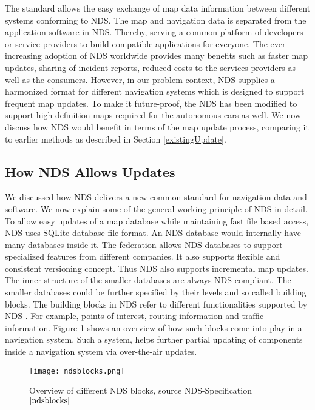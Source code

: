 The standard allows the easy exchange of map data information between different systems conforming to NDS. The map and navigation data is separated from the application software in NDS. Thereby, serving a common platform of developers or service providers to build compatible applications for everyone. The ever increasing adoption of NDS worldwide provides many benefits such as faster map updates, sharing of incident reports, reduced costs to the services providers as well as the consumers. However, in our problem context, NDS supplies a harmonized format for different navigation systems which is designed to support frequent map updates. To make it future-proof, the NDS has been modified to support high-definition maps required for the autonomous cars as well. We now discuss how NDS would benefit in terms of the map update process, comparing it to earlier methods as described in Section \ref{existingUpdate}. 

\subsection{How NDS Allows Updates}
We discussed how NDS delivers a new common standard for navigation data and software. We now explain some of the general working principle of NDS in detail. To allow easy updates of a map database while maintaining fast file based access, NDS uses SQLite database file format. An NDS database would internally have many databases inside it. The federation allows NDS databases to support specialized features from different companies. It also supports flexible and consistent versioning concept. Thus NDS also supports incremental map updates. The inner structure of the smaller databases are always NDS compliant. The smaller databases could be further specified by their levels and so called building blocks. The building blocks in NDS refer to different functionalities supported by NDS \cite{ndsblocks}. For example, points of interest, routing information and traffic information. Figure \ref{fg:ndsblocks} shows an overview of how such blocks come into play in a navigation system. Such a system, helps further partial updating of components inside a navigation system via over-the-air updates.  \\
\begin{figure}
\texttt{[image: ndsblocks.png]}
\label{fg:ndsblocks}
\caption{Overview of different NDS blocks, source NDS-Specification$\cite{ndsblocks}$}
\end{figure}


